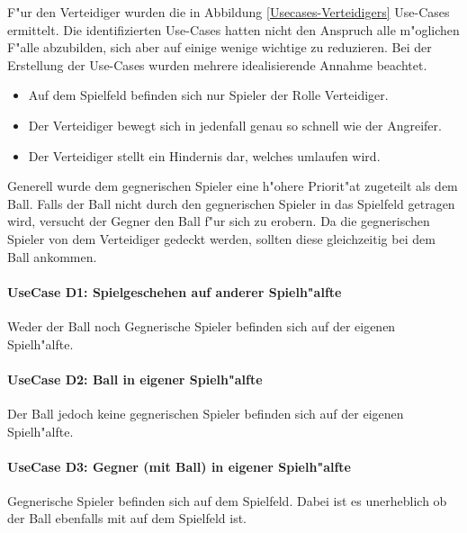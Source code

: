 F"ur den Verteidiger wurden die in Abbildung \ref{Usecases-Verteidigers} Use-Cases ermittelt. Die identifizierten Use-Cases hatten nicht den Anspruch alle m"oglichen F"alle abzubilden, sich aber auf einige wenige wichtige zu reduzieren. Bei der Erstellung der Use-Cases wurden mehrere idealisierende Annahme beachtet.

\begin{itemize}
\item Auf dem Spielfeld befinden sich nur Spieler der Rolle Verteidiger.
\item Der Verteidiger bewegt sich in jedenfall genau so schnell wie der Angreifer.
\item Der Verteidiger stellt ein Hindernis dar, welches umlaufen wird.
\end{itemize}

Generell wurde dem gegnerischen Spieler eine h"ohere Priorit"at zugeteilt als dem Ball. Falls der Ball nicht durch den gegnerischen Spieler in das Spielfeld getragen wird, versucht der Gegner den Ball f"ur sich zu erobern. Da die gegnerischen Spieler von dem Verteidiger gedeckt werden, sollten diese gleichzeitig bei dem Ball ankommen.

\paragraph{UseCase D1: Spielgeschehen auf anderer Spielh"alfte}
\label{UseCaseD1}
Weder der Ball noch Gegnerische Spieler befinden sich auf der eigenen Spielh"alfte.
\paragraph{UseCase D2: Ball in eigener Spielh"alfte}
\label{UseCaseD2}
Der Ball jedoch keine gegnerischen Spieler befinden sich auf der eigenen Spielh"alfte.
\paragraph{UseCase D3: Gegner (mit Ball) in eigener Spielh"alfte}
\label{UseCaseD3}
Gegnerische Spieler befinden sich auf dem Spielfeld. Dabei ist es unerheblich ob der Ball ebenfalls mit auf dem Spielfeld ist.

